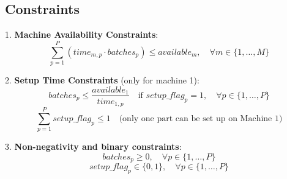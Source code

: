 \documentclass{article}
\begin{document}
\subsection*{Constraints}

1. \textbf{Machine Availability Constraints}:
\[
\sum_{p=1}^{P} (time_{m,p} \cdot batches_{p}) \leq available_{m}, \quad \forall m \in \{1, \ldots, M\}
\]

2. \textbf{Setup Time Constraints} (only for machine 1):
\[
batches_{p} \leq \frac{available_{1}}{time_{1,p}} \quad \text{if } setup\_flag_{p} = 1, \quad \forall p \in \{1, \ldots, P\}
\]
\[
\sum_{p=1}^{P} setup\_flag_{p} \leq 1 \quad \text{(only one part can be set up on Machine 1)}
\]

3. \textbf{Non-negativity and binary constraints}:
\[
batches_{p} \geq 0, \quad \forall p \in \{1, \ldots, P\}
\]
\[
setup\_flag_{p} \in \{0, 1\}, \quad \forall p \in \{1, \ldots, P\}
\]
\end{document}
